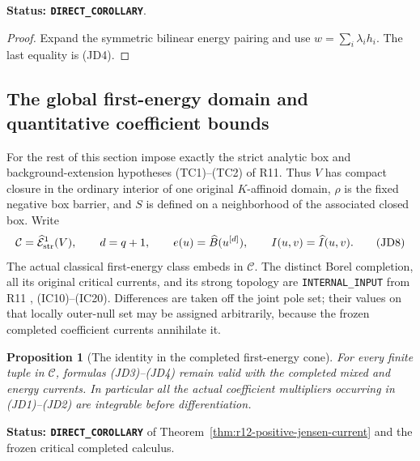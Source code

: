 \documentclass[11pt,a4paper]{article}
\numberwithin{equation}{section}
\newtheorem{proposition}[theorem]{Proposition}
\theoremstyle{definition}
\theoremstyle{remark}
\begin{document}
\noindent\textbf{Status: \texttt{DIRECT\_COROLLARY}}.

\begin{proof}
Expand the symmetric bilinear energy pairing and use
$w=\sum_i\lambda_i h_i$.  The last equality is (JD4).
\end{proof}

\subsection{The global first-energy domain and quantitative coefficient bounds}

For the rest of this section impose exactly the strict analytic box
and background-extension hypotheses (TC1)--(TC2) of R11.  Thus $V$
has compact closure in the ordinary interior of one original
$K$-affinoid domain, $\rho$ is the fixed negative box barrier, and
$S$ is defined on a neighborhood of the associated closed box.
Write
\[
 \mathcal C=\widehat{\mathcal E}^1_{\rm str}(V),\qquad
 d=q+1,\qquad e(u)=\widehat B(u^{[d]}),\qquad I(u,v)=\widehat I(u,v).
 \tag{JD8}
\]
The actual classical first-energy class embeds in $\mathcal C$.
The distinct Borel completion, all its original critical currents,
and its strong topology are \texttt{INTERNAL\_INPUT} from R11
, (IC10)--(IC20).
Differences are taken off the joint pole set; their values on that
locally outer-null set may be assigned arbitrarily, because the
frozen completed coefficient currents annihilate it.

\begin{proposition}[The identity in the completed first-energy cone]
\label{prop:r12-completed-jensen-current}
For every finite tuple in $\mathcal C$, formulas (JD3)--(JD4) remain
valid with the completed mixed and energy currents.  In particular
all the actual coefficient multipliers occurring in (JD1)--(JD2)
are integrable before differentiation.
\end{proposition}

\noindent\textbf{Status: \texttt{DIRECT\_COROLLARY}} of
Theorem~\ref{thm:r12-positive-jensen-current} and the frozen critical
completed calculus.
\end{document}
